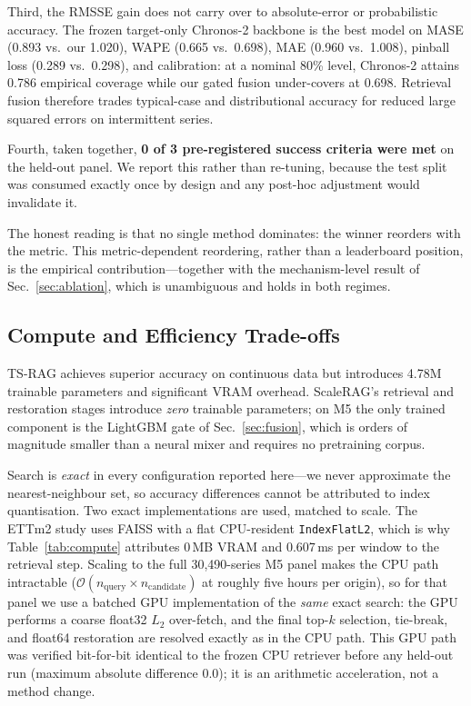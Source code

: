 Third, the RMSSE gain does not carry over to absolute-error or probabilistic accuracy. The frozen target-only Chronos-2 backbone is the best model on MASE (0.893 vs.\ our 1.020), WAPE (0.665 vs.\ 0.698), MAE (0.960 vs.\ 1.008), pinball loss (0.289 vs.\ 0.298), and calibration: at a nominal 80\% level, Chronos-2 attains 0.786 empirical coverage while our gated fusion under-covers at 0.698. Retrieval fusion therefore trades typical-case and distributional accuracy for reduced large squared errors on intermittent series.

Fourth, taken together, \textbf{0 of 3 pre-registered success criteria were met} on the held-out panel. We report this rather than re-tuning, because the test split was consumed exactly once by design and any post-hoc adjustment would invalidate it.

The honest reading is that no single method dominates: the winner reorders with the metric. This metric-dependent reordering, rather than a leaderboard position, is the empirical contribution---together with the mechanism-level result of Sec.~\ref{sec:ablation}, which is unambiguous and holds in both regimes.

\subsection{Compute and Efficiency Trade-offs}
\label{sec:compute}
TS-RAG achieves superior accuracy on continuous data but introduces 4.78M trainable parameters and significant VRAM overhead. ScaleRAG's retrieval and restoration stages introduce \emph{zero} trainable parameters; on M5 the only trained component is the LightGBM gate of Sec.~\ref{sec:fusion}, which is orders of magnitude smaller than a neural mixer and requires no pretraining corpus.

Search is \emph{exact} in every configuration reported here---we never approximate the nearest-neighbour set, so accuracy differences cannot be attributed to index quantisation. Two exact implementations are used, matched to scale. The ETTm2 study uses FAISS with a flat CPU-resident \texttt{IndexFlatL2}, which is why Table~\ref{tab:compute} attributes 0\,MB VRAM and 0.607\,ms per window to the retrieval step. Scaling to the full 30,490-series M5 panel makes the CPU path intractable ($\mathcal{O}(n_{\text{query}} \times n_{\text{candidate}})$ at roughly five hours per origin), so for that panel we use a batched GPU implementation of the \emph{same} exact search: the GPU performs a coarse float32 $L_2$ over-fetch, and the final top-$k$ selection, tie-break, and float64 restoration are resolved exactly as in the CPU path. This GPU path was verified bit-for-bit identical to the frozen CPU retriever before any held-out run (maximum absolute difference 0.0); it is an arithmetic acceleration, not a method change.

